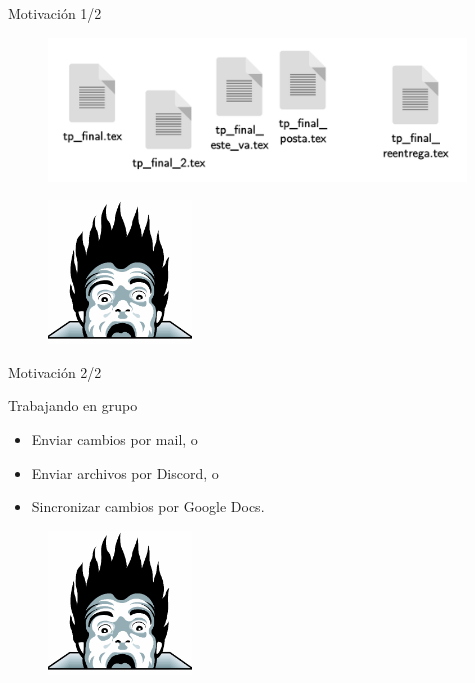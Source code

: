 \begin{frame}{Motivación 1/2}

    \begin{figure}[ht]
        \begin{center}
            \includegraphics[height=1.5in]{images/caos.pdf}
        \end{center}
    \end{figure}

    \pause
    \begin{figure}[ht]
        \begin{center}
            \includegraphics[height=1.5in]{images/horror.png}
        \end{center}
    \end{figure}
\end{frame}
\begin{frame}{Motivación 2/2}

    \begin{block}{Trabajando en grupo}
        \begin{itemize}
            \item Enviar cambios por mail, o
            \pause
            \item Enviar archivos por Discord, o
            \pause
            \item Sincronizar cambios por Google Docs.
        \end{itemize}
    \end{block}

    \pause
    \begin{figure}[h]
        \begin{center}
            \includegraphics[height=1.5in]{images/horror.png}
        \end{center}
    \end{figure}

\end{frame}

